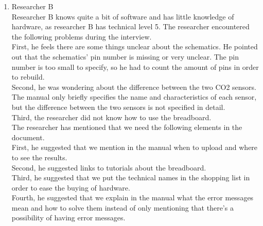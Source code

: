 \documentclass[conference]{IEEEtran}
\begin{document}
\begin{figure*}[ht]
\begin{enumerate}
\begin{enumerate}
\begin{figure*}[!ht]
\begin{enumerate}
\begin{enumerate}
					\item Researcher B\\
					Researcher B knows quite a bit of software and has little knowledge of hardware, as researcher B has technical level 5. The researcher encountered the following problems during the interview.\\
					First, he feels there are some things unclear about the schematics. He pointed out that the schematics' pin number is missing or very unclear. The pin number is too small to specify, so he had to count the amount of pins in order to rebuild.\\
					Second, he was wondering about the difference between the two CO2 sensors. The manual only briefly specifies the name and characteristics of each sensor, but the difference between the two sensors is not specified in detail.\\
					Third, the researcher did not know how to use the breadboard.\\
					The researcher has mentioned that we need the following elements in the document.\\
					First, he suggested that we mention in the manual when to upload and where to see the results. \\
					Second, he suggested links to tutorials about the breadboard.\\
					Third, he suggested that we put the technical names in the shopping list in order to ease the buying of hardware.\\
					Fourth, he suggested that we explain in the manual what the error messages mean and how to solve them instead of only mentioning that there's a possibility of having error messages.\\
					

\end{enumerate}
\end{enumerate}
\end{figure*}
\end{enumerate}
\end{enumerate}
\end{figure*}
\end{document}
